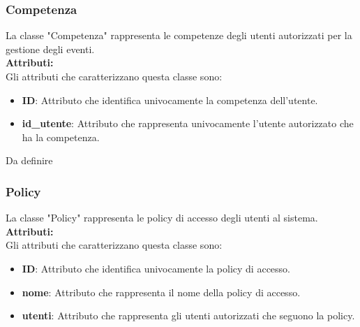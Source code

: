 \documentclass{article}
\begin{document}
\subsubsection{Competenza}

La classe "Competenza" rappresenta le competenze degli utenti autorizzati per la gestione degli eventi.\\

\textbf{Attributi:}\\
Gli attributi che caratterizzano questa classe sono:
\begin{itemize}
    \item \textbf{ID}: Attributo che identifica univocamente la competenza dell'utente.
    \item \textbf{id\_utente}: Attributo che rappresenta univocamente l'utente autorizzato che ha la competenza.
\end{itemize}

Da definire

\subsubsection{Policy}

La classe "Policy" rappresenta le policy di accesso degli utenti al sistema.\\

\textbf{Attributi:}\\
Gli attributi che caratterizzano questa classe sono:
\begin{itemize}
    \item \textbf{ID}: Attributo che identifica univocamente la policy di accesso.
    \item \textbf{nome}: Attributo che rappresenta il nome della policy di accesso.
    \item \textbf{utenti}: Attributo che rappresenta gli utenti autorizzati che seguono la policy.
\end{itemize}

\clearpage
\end{document}
